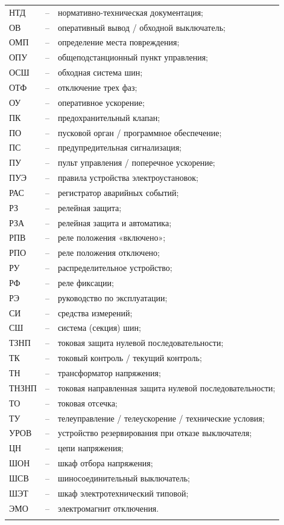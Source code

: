 \begin{longtable}{>{\raggedright\arraybackslash}m{2cm}>{\raggedright\arraybackslash}m{0.5cm}>{\raggedright\arraybackslash}m{20cm}}
НТД & -- & нормативно-техническая документация; \\
ОВ & -- & оперативный вывод / обходной выключатель; \\
ОМП & -- & определение места повреждения; \\
ОПУ & -- & общеподстанционный пункт управления; \\
ОСШ & -- & обходная система шин; \\
ОТФ & -- & отключение трех фаз; \\
ОУ & -- & оперативное ускорение; \\
ПК & -- & предохранительный клапан; \\
ПО & -- & пусковой орган / программное обеспечение; \\
ПС & -- & предупредительная сигнализация; \\
ПУ & -- & пульт управления / поперечное ускорение; \\
ПУЭ & -- & правила устройства электроустановок; \\
РАС & -- & регистратор аварийных событий; \\
РЗ & -- & релейная защита; \\
РЗА & -- & релейная защита и автоматика; \\
РПВ & -- & реле положения «включено»; \\
РПО & -- & реле положения отключено; \\
РУ & -- & распределительное устройство; \\
РФ & -- & реле фиксации; \\
РЭ & -- & руководство по эксплуатации; \\
СИ & -- & средства измерений; \\
СШ & -- & система (секция) шин; \\
ТЗНП & -- & токовая защита нулевой последовательности; \\
ТК & -- & токовый контроль / текущий контроль; \\
ТН & -- & трансформатор напряжения; \\
ТНЗНП & -- & токовая направленная защита нулевой последовательности; \\
ТО & -- & токовая отсечка; \\
ТУ & -- & телеуправление / телеускорение / технические условия; \\
УРОВ & -- & устройство резервирования при отказе выключателя; \\
ЦН & -- & цепи напряжения; \\
ШОН & -- & шкаф отбора напряжения; \\
ШСВ & -- & шиносоединительный выключатель; \\
ШЭТ & -- & шкаф электротехнический типовой; \\
ЭМО & -- & электромагнит отключения. \\
{\color{white}\fontsize{0.1pt}{0.1pt}\selectfont<endABBRS>}
\end{longtable}
